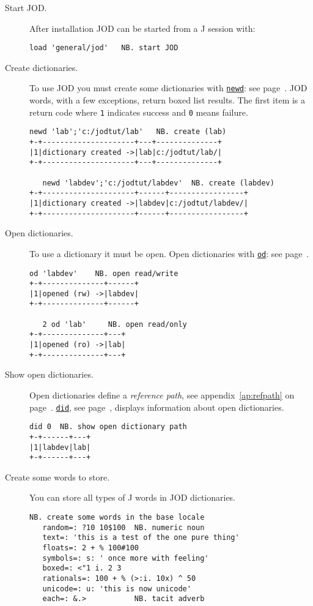 \begin{description}
\item[Start JOD.]  After installation JOD can be started from a J session with:
\begin{lstlisting}[frame=single,framerule=0pt]
   load 'general/jod'   NB. start JOD 
\end{lstlisting}


\item[Create dictionaries.] To use JOD you must create some dictionaries
with \hyperlink{il:newd}{\texttt{newd}}: see page~\pageref{ss:newd}.
JOD words, with a few exceptions, return boxed list results.  The first
item is a return code where \texttt{1} indicates success and \texttt{0} means failure.
\begin{lstlisting}[frame=single,framerule=0pt]
   newd 'lab';'c:/jodtut/lab'   NB. create (lab)
+-+---------------------+---+--------------+
|1|dictionary created ->|lab|c:/jodtut/lab/|
+-+---------------------+---+--------------+

   newd 'labdev';'c:/jodtut/labdev'  NB. create (labdev)
+-+---------------------+------+-----------------+
|1|dictionary created ->|labdev|c:/jodtut/labdev/|
+-+---------------------+------+-----------------+
\end{lstlisting}

\item[Open dictionaries.] To use a dictionary it must be open. Open
dictionaries with \hyperlink{il:odd}{\texttt{od}}: see page~\pageref{ss:od}.
\begin{lstlisting}[frame=single,framerule=0pt] 
   od 'labdev'    NB. open read/write
+-+--------------+------+
|1|opened (rw) ->|labdev|
+-+--------------+------+
 
   2 od 'lab'     NB. open read/only
+-+--------------+---+
|1|opened (ro) ->|lab|
+-+--------------+---+
\end{lstlisting}

\item[Show open dictionaries.] Open dictionaries define a \emph{reference path}, see
appendix~\ref{ap:refpath} on page~\pageref{ap:refpath}. \hyperlink{il:did}{\texttt{did}}, see page~\pageref{ss:did}, displays information about open dictionaries.
\begin{lstlisting}[frame=single,framerule=0pt]
   did 0  NB. show open dictionary path
+-+------+---+
|1|labdev|lab|
+-+------+---+
\end{lstlisting}

\item[Create some words to store.] You can store all types of J words
in JOD dictionaries.
\begin{lstlisting}[frame=single,framerule=0pt]
   NB. create some words in the base locale
   random=: ?10 10$100  NB. numeric noun
   text=: 'this is a test of the one pure thing'
   floats=: 2 + % 100#100
   symbols=: s: ' once more with feeling'
   boxed=: <"1 i. 2 3
   rationals=: 100 + % (>:i. 10x) ^ 50
   unicode=: u: 'this is now unicode'
   each=: &.>           NB. tacit adverb
   

\end{lstlisting}
\end{description}
